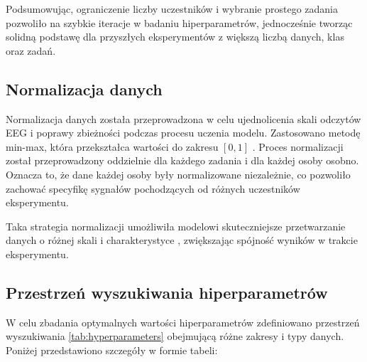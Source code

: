 \documentclass[eeg_v4.tex]{subfiles}
\begin{document}
    Podsumowując, ograniczenie liczby uczestników i wybranie prostego zadania pozwoliło na szybkie iteracje w badaniu
    hiperparametrów, jednocześnie tworząc solidną podstawę dla przyszłych eksperymentów z większą liczbą danych, klas
    oraz zadań.

    \subsection{Normalizacja danych}

    Normalizacja danych została przeprowadzona w celu ujednolicenia skali odczytów EEG i poprawy zbieżności podczas
    procesu uczenia modelu. Zastosowano metodę min-max, która przekształca wartości do zakresu $[0, 1]$
    . Proces normalizacji został przeprowadzony oddzielnie dla każdego zadania i dla każdej osoby osobno. Oznacza to, że
    dane każdej osoby były normalizowane niezależnie, co pozwoliło zachować specyfikę sygnałów pochodzących od różnych
    uczestników eksperymentu.

    Taka strategia normalizacji umożliwiła modelowi skuteczniejsze przetwarzanie danych o różnej skali i charakterystyce
    , zwiększając spójność wyników w trakcie eksperymentu.

    \subsection{Przestrzeń wyszukiwania hiperparametrów}

    W celu zbadania optymalnych wartości hiperparametrów zdefiniowano przestrzeń wyszukiwania \ref{tab:hyperparameters}
    obejmującą różne zakresy i
    typy danych. Poniżej przedstawiono szczegóły w formie tabeli:
\end{document}
